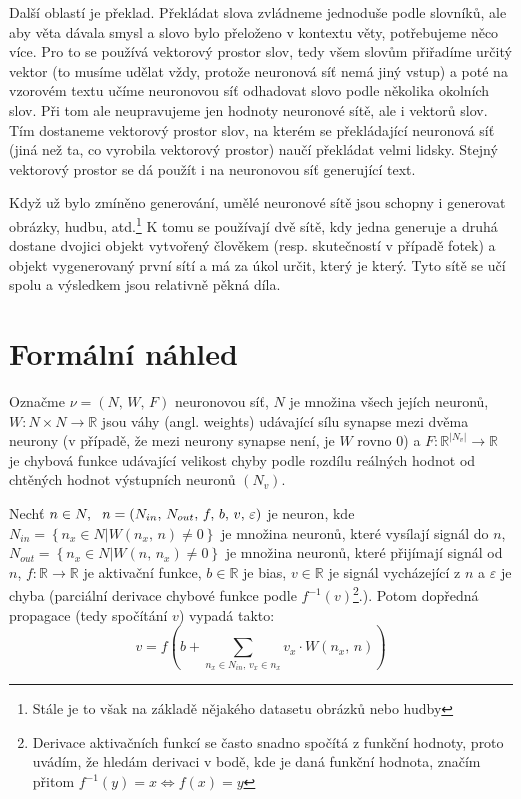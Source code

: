 \documentclass[12pt]{report}			%
\newcommand{\R}{\mathbb{R}}   			%
\begin{document}
					Další oblastí je překlad. Překládat slova zvládneme jednoduše podle slovníků, ale aby věta dávala smysl a slovo bylo přeloženo v kontextu věty, potřebujeme něco více. Pro to se používá vektorový prostor slov, tedy všem slovům přiřadíme určitý vektor (to musíme udělat vždy, protože neuronová síť nemá jiný vstup) a poté na vzorovém textu učíme neuronovou síť odhadovat slovo podle několika okolních slov. Při tom ale neupravujeme jen hodnoty neuronové sítě, ale i vektorů slov. Tím dostaneme vektorový prostor slov, na kterém se překládající neuronová síť (jiná než ta, co vyrobila vektorový prostor) naučí překládat velmi lidsky. Stejný vektorový prostor se dá použít i na neuronovou síť generující text.
					
					Když už bylo zmíněno generování, umělé neuronové sítě jsou schopny i generovat obrázky, hudbu, atd.\footnote{Stále je to však na základě nějakého datasetu obrázků nebo hudby} K tomu se používají dvě sítě, kdy jedna generuje a druhá dostane dvojici objekt vytvořený člověkem (resp. skutečností v případě fotek) a objekt vygenerovaný první sítí a má za úkol určit, který je který. Tyto sítě se učí spolu a výsledkem jsou relativně pěkná díla.
			
			
			\chapter{Formální náhled}
				Označme $\nu = (N,\,W,\,F)$ neuronovou síť, $N$ je množina všech jejích neuronů, $W\!: N\times N \rightarrow \R$ jsou váhy (angl. weights) udávající sílu synapse mezi dvěma neurony (v případě, že mezi neurony synapse není, je $W$ rovno $0$) a $F\!: \R^{|N_v|} \rightarrow \R$ je chybová funkce udávající velikost chyby podle rozdílu reálných hodnot od chtěných hodnot výstupních neuronů $\left(N_v\right)$.
			
				Nechť $n \in N, \hspace{1.5ex} n = \left(N_{in},\,N_{out},\,f,\,b,\,v,\,\varepsilon\right)$ je neuron, kde $N_{in} = \left\{n_x \in N|W\left(n_x,\,n\right) \neq 0\right\}$ je množina neuronů, které vysílají signál do $n$, $N_{out} = \left\{n_x \in N|W\left(n,\,n_x\right) \neq 0\right\}$ je množina neuronů, které přijímají signál od $n$, $f\!: \R \rightarrow \R$ je aktivační funkce, $b \in \R$ je bias, $v \in \R$ je signál vycházející z $n$ a $\varepsilon$ je chyba (parciální derivace chybové funkce podle $f^{-1}(v)$\footnote{Derivace aktivačních funkcí se často snadno spočítá z funkční hodnoty, proto uvádím, že hledám derivaci v bodě, kde je daná funkční hodnota, značím přitom $f^{-1}(y) = x \Leftrightarrow f(x) = y$}.). Potom dopředná propagace (tedy spočítání $v$) vypadá takto:
				\begin{equation} v = f\left(b + \sum_{n_x \in N_{in},\,v_x \in n_x} v_x \cdot W\left(n_x,\,n\right) \right) \end{equation}
				
\end{document}
